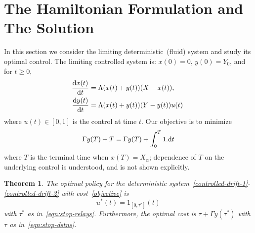 \documentclass[10pt,journal,letterpaper]{IEEEtran}
\newtheorem{theorem}{Theorem}[section]
\begin{document}
\section{The Hamiltonian Formulation and The Solution}
\label{hamiltonian}

In this section we consider the limiting deterministic~(fluid) system  
and study its optimal control.
The limiting controlled system is: $x(0) = 0$, $y(0) = Y_0$, and for $t \geq 0$,
\begin{subequations}
\begin{align}
\frac{{\rm d}x(t)}{{\rm d}t} &= \Lambda (x(t) + y(t))(X-x(t)), \label{controlled-drift-1}\\
\frac{{\rm d}y(t)}{{\rm d}t} &=  \Lambda (x(t) + y(t))(Y-y(t))u(t) \label{controlled-drift-2}\
\end{align}
\end{subequations}
where $u(t) \in [0,1]$ is the control at time $t$. Our objective is to minimize
\begin{equation}
\Gamma y(T) + T = \Gamma y(T) + \int_0^{T}1 . {\rm d}t \label{objective}
\end{equation}
where $T$ is the terminal time when $x(T) = X_{\alpha}$; dependence of $T$ on the underlying control is understood, and
is not shown explicitly. 
\begin{theorem}
The optimal policy for the deterministic system~\eqref{controlled-drift-1}-\eqref{controlled-drift-2} with cost~\eqref{objective} 
is 
\[u^{\ast}(t) = 1_{[0,\tau^{\ast}]}(t)\]
with $\tau^{\ast}$ as in~\eqref{eqn:stop-relays}.
Furthermore, the optimal cost is $\tau + \Gamma y(\tau^{\ast})$ with  $\tau$ as in~\eqref{eqn:stop-dstns}.
\end{theorem}
\end{document}
